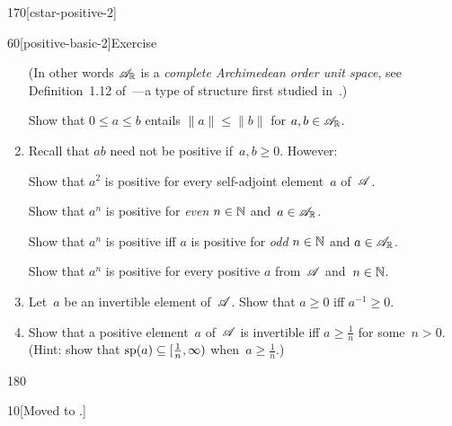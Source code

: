 \begin{parsec}{170}[cstar-positive-2]
\begin{point}{60}[positive-basic-2]{Exercise}
\begin{enumerate}
(In other words
$\mathscr{A}_{\mathbb{R}}$ is a \emph{complete Archimedean order unit space},
see Definition~1.12 of~\cite{alfsen2012}---a 
type of structure first studied in~\cite{kadison1951}.)


Show that $0\leq a \leq b$ entails $\|a\|\leq \|b\|$
for $a,b\in\mathscr{A}_{\mathbb{R}}$.

\item 
Recall that $ab$ need not be positive if~$a,b\geq 0$. However:

Show that $a^2$ is positive for every self-adjoint element~$a$ of~$\mathscr{A}$.

Show that $a^n$ is positive for \emph{even} $n\in \mathbb{N}$ and~$a\in\mathscr{A}_{\mathbb{R}}$.

Show that $a^n$ is positive iff $a$ is positive for \emph{odd} $n\in \mathbb{N}$
and $a\in\mathscr{A}_{\mathbb{R}}$.

Show that $a^n$ is positive
for every positive $a$ from~$\mathscr{A}$ and~$n\in \mathbb{N}$.
\item
Let~$a$ be an invertible element of~$\mathscr{A}$.
Show that $a\geq 0$ iff $a^{-1}\geq 0$.

\item
Show that a positive element~$a$ of~$\mathscr{A}$ is invertible
iff $a\geq \frac{1}{n}$ for some~$n>0$.
(Hint: show that $\mathrm{sp}(a)\subseteq [\frac{1}{n},\infty)$
		when~$a\geq \frac{1}{n}$.)
\end{enumerate}
\end{point}
\end{parsec}
\begin{parsec}{180}%
\begin{point}{10}{[Moved to .]}
\end{point}
\end{parsec}
